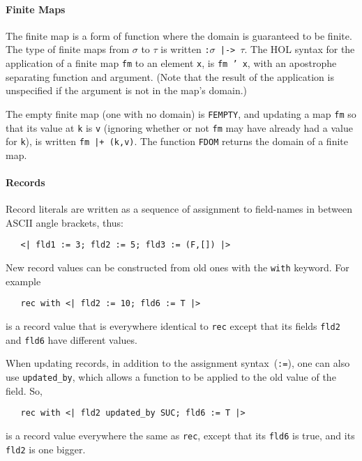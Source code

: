 \documentclass[11pt]{article}
\begin{document}
\paragraph{Finite Maps}
The finite map is a form of function where the domain is guaranteed to
be finite.  The type of finite maps from $\sigma$ to $\tau$ is written
\texttt{:$\sigma$~|->~$\tau$}.  The HOL syntax for the application of
a finite map \texttt{fm} to an element \texttt{x}, is \texttt{fm~'~x},
with an apostrophe separating function and argument.  (Note that the
result of the application is unspecified if the argument is not in the
map's domain.)

The empty finite map (one with no domain) is \texttt{FEMPTY}, and
updating a map \texttt{fm} so that its value at \texttt{k} is
\texttt{v} (ignoring whether or not \texttt{fm} may have already had a
value for \texttt{k}), is written \texttt{fm |+ (k,v)}.  The function
\texttt{FDOM} returns the domain of a finite map.

\paragraph{Records}
%
Record literals are written as a sequence of assignment to field-names
in between ASCII angle brackets, thus:
\begin{verbatim}
   <| fld1 := 3; fld2 := 5; fld3 := (F,[]) |>
\end{verbatim}
%
New record values can be constructed from old ones with the
\texttt{with} keyword.  For example
\begin{verbatim}
   rec with <| fld2 := 10; fld6 := T |>
\end{verbatim}
is a record value that is everywhere identical to \texttt{rec} except
that its fields \texttt{fld2} and \texttt{fld6} have different
values.

%
When updating records, in addition to the assignment
syntax~(\texttt{:=}), one can also use \texttt{updated_by}, which
allows a function to be applied to the old value of the field.  So,
\begin{verbatim}
   rec with <| fld2 updated_by SUC; fld6 := T |>
\end{verbatim}
is a record value everywhere the same as \texttt{rec}, except that its
\texttt{fld6} is true, and its \texttt{fld2} is one bigger.
\end{document}
